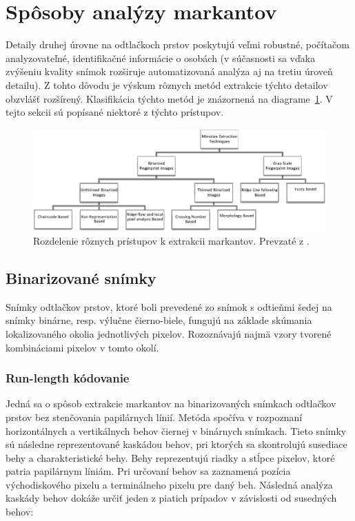   \section{Spôsoby analýzy markantov} \label{sec:analyza_markantov}
  Detaily druhej úrovne na odtlačkoch prstov poskytujú veľmi robustné, počítačom analyzovateľné, identifikačné informácie o osobách (v súčasnosti sa vďaka
  zvýšeniu kvality snímok rozširuje automatizovaná analýza aj na tretiu úroveň detailu). Z tohto dôvodu je výskum rôznych metód extrakcie týchto detailov
  obzvlášť rozšírený. Klasifikácia týchto metód je znázornená na diagrame~{\ref{obr:diagram_extrakcia_markantov}}. V tejto sekcii sú popísané niektoré
  z týchto prístupov.

  \begin{figure}[h]
    \centering
    \includegraphics[width=\linewidth]{obrazky-figures/klasifikacia_extrakcie_markantov.png}
    \caption{Rozdelenie rôznych prístupov k extrakcii markantov. Prevzaté z \cite{bansal2011minutiae}.}
    \label{obr:diagram_extrakcia_markantov}
  \end{figure}

  \subsection{Binarizované snímky}
  Snímky odtlačkov prstov, ktoré boli prevedené zo snímok s odtieňmi šedej na snímky binárne, resp. výlučne čierno-biele, fungujú na základe skúmania
  lokalizovaného okolia jednotlivých pixelov. Rozoznávajú najmä vzory tvorené kombináciami pixelov v tomto okolí.

  \subsubsection{Run-length kódovanie}
  Jedná sa o spôsob extrakcie markantov na binarizovaných snímkach odtlačkov prstov bez stenčovania papilárnych línií.
  Metóda spočíva v rozpoznaní horizontálnych a vertikálnych behov čiernej v binárnych snímkach. Tieto snímky sú následne reprezentované kaskádou behov,
  pri ktorých sa skontrolujú susediace behy a charakteristické behy. Behy reprezentujú riadky a stĺpce pixelov, ktoré patria papilárnym líniám. Pri určovaní
  behov sa zaznamená pozícia východiskového pixelu a terminálneho pixelu pre daný beh. Následná analýza kaskády behov dokáže určiť jeden z piatich
  prípadov v závislosti od susedných behov:

